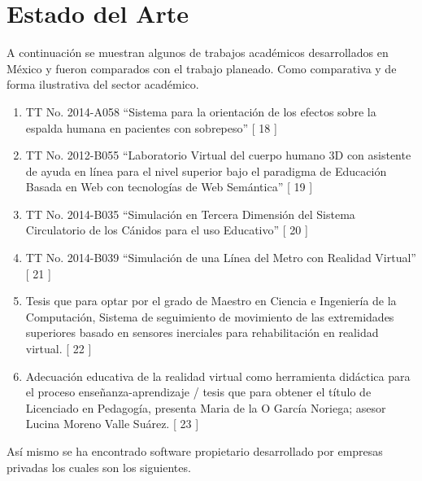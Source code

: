 \section{Estado del Arte}
A continuación se muestran algunos de trabajos académicos desarrollados en México y fueron comparados con el trabajo planeado. Como comparativa y de forma ilustrativa del sector académico.
\\
\newline
\begin{enumerate}
\item TT No. 2014-A058 “Sistema para la orientación de los efectos sobre la espalda humana en pacientes con sobrepeso” [ 18 ]
\item TT No. 2012-B055 “Laboratorio Virtual del cuerpo humano 3D con asistente de ayuda en línea para el nivel superior bajo el paradigma de Educación Basada en Web con tecnologías de Web Semántica” [ 19 ]
\item TT No. 2014-B035 “Simulación en Tercera Dimensión del Sistema Circulatorio de los Cánidos para el uso Educativo” [ 20 ]
\item TT No. 2014-B039 “Simulación de una Línea del Metro con Realidad Virtual” [ 21 ]
\item Tesis que para optar por el grado de Maestro en Ciencia e Ingeniería de la Computación, Sistema de seguimiento de movimiento de las extremidades superiores basado en sensores inerciales para rehabilitación en realidad virtual. [ 22 ]
\item Adecuación educativa de la realidad virtual como herramienta didáctica para el proceso enseñanza-aprendizaje / tesis que para obtener el título de Licenciado en Pedagogía, presenta Maria de la O García Noriega; asesor Lucina Moreno Valle Suárez.  [ 23 ]
\end{enumerate}
Así mismo se ha encontrado software propietario desarrollado por empresas privadas los cuales son los siguientes.\\
